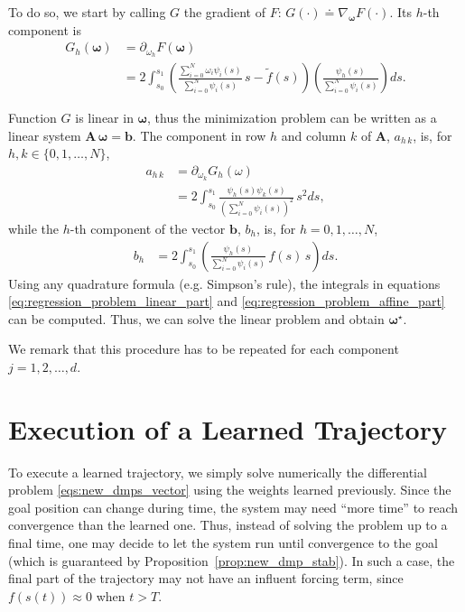 \documentclass[fleqn, 11pt]{article}
\theoremstyle{definition}
\theoremstyle{plain}
\theoremstyle{remark}
\begin{document}
To do so, we start by calling $G$ the gradient of $F$: \( G(\cdot) \doteq \nabla_{\bm{\omega}} F(\cdot) \).
Its $h$-th component is
\begin{subequations}
    \begin{align}
        G_h(\bm{\omega})
            & = \partial_{\omega_h} {F}(\bm{\omega}) \\
            & = 2 \int_{s_0}^{s_1} \left(  { \frac{ \sum_{i=0}^N \omega_i \psi_i(s) }{ \sum_{i=0}^N \psi_i(s) } \,s - \tilde{f}(s) } \right) \left( { \frac{ \psi_h(s) }{ \sum_{i=0}^N \psi_i(s) } } \right)  d\! s .
    \end{align}
\end{subequations}

Function $G$ is linear in $\bm{\omega}$, thus the minimization problem can be written as a linear system \( \mathbf{A}\,\bm{\omega} = \mathbf{b} \).
The component in row $h$ and column $k$ of $\mathbf{A}$, $a_{h\,k}$, is, for $h,k \in \{ 0,1,\ldots,N \}$,
\begin{align}
    a_{h \, k} & = \partial_{\omega_k} {G_h}( \omega ) \\
        & = 2 \int_{s_0}^{s_1} \frac{\psi_h (s) \psi_k (s)}{ \left( { \sum_{i=0}^{N} \psi_i(s) } \right) ^2 } \, s^2 d\! s, \label{eq:regression_problem_linear_part}
\end{align}
while the $h$-th component of the vector $\mathbf{b}$, $ b_h $, is, for $ h = 0,1,\ldots,N $,
\begin{align}
    b_h & = 2 \int_{s_0}^{s_1} \left( { \frac{ \psi_h(s) }{\sum_{i=0}^{N} \psi_i(s)} \, f (s) \, s } \right)  d\! s . \label{eq:regression_problem_affine_part}
\end{align}
Using any quadrature formula (e.g. Simpson's rule), the integrals in equations \eqref{eq:regression_problem_linear_part} and \eqref{eq:regression_problem_affine_part} can be computed.
Thus, we can solve the linear problem and obtain $\bm{\omega} ^ \star$.

We remark that this procedure has to be repeated for each component $j=1,2,\ldots, d$.

\section{Execution of a Learned Trajectory}

To execute a learned trajectory, we simply solve numerically the differential problem \eqref{eqs:new_dmps_vector} using the weights learned previously.
Since the goal position can change during time, the system may need ``more time'' to reach convergence than the learned one.
Thus, instead of solving the problem up to a final time, one may decide to let the system run until convergence to the goal (which is guaranteed by Proposition~\ref{prop:new_dmp_stab}).
In such a case, the final part of the trajectory may not have an influent forcing term, since $f(s(t)) \approx 0$ when $t > T$.
\end{document}
